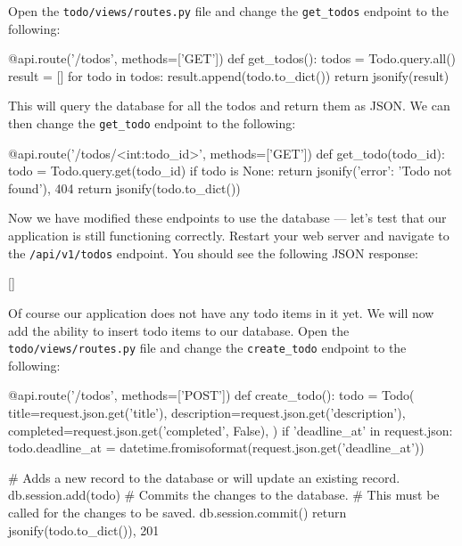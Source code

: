 \documentclass{csse4400}
\begin{document}
Open the \texttt{todo/views/routes.py} file and change the \texttt{get\_todos} endpoint to the following:

\begin{code}[language=python,numbers=none]{}
@api.route('/todos', methods=['GET'])
def get_todos():
    todos = Todo.query.all()
    result = []
    for todo in todos:
        result.append(todo.to_dict())
    return jsonify(result)
\end{code}

This will query the database for all the todos and return them as JSON.
We can then change the \texttt{get\_todo} endpoint to the following:

\begin{code}[language=python,numbers=none]{}
@api.route('/todos/<int:todo_id>', methods=['GET'])
def get_todo(todo_id):
    todo = Todo.query.get(todo_id)
    if todo is None:
        return jsonify({'error': 'Todo not found'}), 404
    return jsonify(todo.to_dict())
\end{code}

Now we have modified these endpoints to use the database --- let's test that our application is still functioning correctly.
Restart your web server and navigate to the \texttt{/api/v1/todos} endpoint.
You should see the following JSON response:

\begin{code}[language=json,numbers=none]{}
  []
\end{code}

Of course our application does not have any todo items in it yet.
We will now add the ability to insert todo items to our database.
Open the \texttt{todo/views/routes.py} file and change the \texttt{create\_todo} endpoint to the following:

\begin{code}[language=python,numbers=none]{}
@api.route('/todos', methods=['POST'])
def create_todo():
    todo = Todo(
        title=request.json.get('title'),
        description=request.json.get('description'),
        completed=request.json.get('completed', False),
    )
    if 'deadline_at' in request.json:
        todo.deadline_at = datetime.fromisoformat(request.json.get('deadline_at'))

    # Adds a new record to the database or will update an existing record.
    db.session.add(todo)
    # Commits the changes to the database.
    # This must be called for the changes to be saved.
    db.session.commit()
    return jsonify(todo.to_dict()), 201
\end{code}
\end{document}
